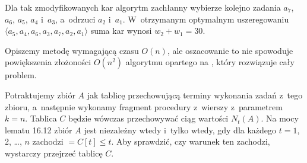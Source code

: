 
\exercise %
Dla tak zmodyfikowanych kar algorytm zachłanny wybierze kolejno zadania $a_7$, $a_6$, $a_5$, $a_4$ i~$a_3$, a~odrzuci $a_2$ i~$a_1$.
W~otrzymanym optymalnym uszeregowaniu $\langle a_5,a_4,a_6,a_3,a_7,a_2,a_1\rangle$ suma kar wynosi $w_2+w_1=30$.

\exercise %
Opiszemy metodę wymagającą czasu $O(n)$, ale oszacowanie to nie spowoduje powiększenia złożoności $O(n^2)$ algorytmu opartego na , który rozwiązuje cały problem.

Potraktujemy zbiór $A$ jak tablicę przechowującą terminy wykonania zadań z~tego zbioru, a~następnie wykonamy fragment procedury  z~wierszy  z~parametrem $k=n$.
Tablica $C$ będzie wówczas przechowywać ciąg wartości $N_t(A)$.
Na mocy lematu 16.12 zbiór $A$ jest niezależny wtedy i~tylko wtedy, gdy dla każdego $t=1$, 2, \dots, $n$ zachodzi $=C[t]\le t$.
Aby sprawdzić, czy warunek ten zachodzi, wystarczy przejrzeć tablicę $C$.
